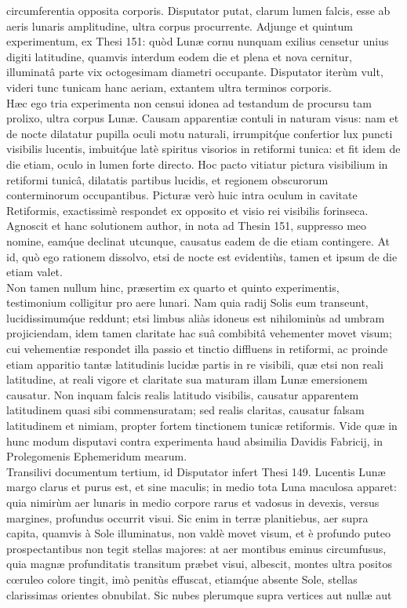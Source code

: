 \documentclass[a4paper, 11pt, oneside, polutonikogreek, german]{article}
\begin{document}
circumferentia opposita corporis. Disputator putat, clarum lumen falcis, esse ab aeris lunaris amplitudine, ultra corpus procurrente. Adjunge et quintum experimentum, ex Thesi 151: quòd Lunæ cornu nunquam exilius censetur unius digiti latitudine, quamvis interdum eodem die et plena et nova cernitur, illuminatâ parte vix octogesimam diametri occupante. Disputator iterùm vult, videri tunc tunicam hanc aeriam, extantem ultra terminos corporis.\\\hspace*{5mm}Hæc ego tria experimenta non censui idonea ad testandum de procursu tam prolixo, ultra corpus Lunæ. Causam apparentiæ contuli in naturam visus: nam et de nocte dilatatur pupilla oculi motu naturali, irrumpit\'que confertior lux puncti visibilis lucentis, imbuit\'que latè spiritus visorios in retiformi tunica: et fit idem de die etiam, oculo in lumen forte directo. Hoc pacto vitiatur pictura visibilium in retiformi tunicâ, dilatatis partibus lucidis, et regionem obscurorum conterminorum occupantibus. Picturæ verò huic intra oculum in cavitate Retiformis, exactissimè respondet ex opposito et visio rei visibilis forinseca.\\\hspace*{5mm}Agnoscit et hanc solutionem author, in nota ad Thesin 151, suppresso meo nomine, eam\'que declinat utcunque, causatus eadem de die etiam contingere. At id, quò ego rationem dissolvo, etsi de nocte est evidentiùs, tamen et ipsum de die etiam valet.\\\hspace*{5mm}Non tamen nullum hinc, præsertim ex quarto et quinto experimentis, testimonium colligitur pro aere lunari. Nam quia radij Solis eum transeunt, lucidissimum\'que reddunt; etsi limbus aliàs idoneus est nihilominùs ad umbram projiciendam, idem tamen claritate hac suâ combibitâ vehementer movet visum; cui vehementiæ respondet illa passio et tinctio diffluens in retiformi, ac proinde etiam apparitio tantæ latitudinis lucidæ partis in re visibili, quæ etsi non reali latitudine, at reali vigore et claritate sua maturam illam Lunæ emersionem causatur. Non inquam falcis realis latitudo visibilis, causatur apparentem latitudinem quasi sibi commensuratam; sed realis claritas, causatur falsam latitudinem et nimiam, propter fortem tinctionem tunicæ retiformis. Vide quæ in hunc modum disputavi contra experimenta haud absimilia Davidis Fabricij, in Prolegomenis Ephemeridum mearum.\\\hspace*{5mm}Transilivi documentum tertium, id Disputator infert Thesi 149. Lucentis Lunæ margo clarus et purus est, et sine maculis; in medio tota Luna maculosa apparet: quia nimirùm aer lunaris in medio corpore rarus et vadosus in devexis, versus margines, profundus occurrit visui. Sic enim in terræ planitiebus, aer supra capita, quamvis à Sole illuminatus, non valdè movet visum, et è profundo puteo prospectantibus non tegit stellas majores: at aer montibus eminus circumfusus, quia magnæ profunditatis transitum præbet visui, albescit, montes ultra positos cœruleo colore tingit, imò penitùs effuscat, etiam\'que absente Sole, stellas clarissimas orientes obnubilat. Sic nubes plerumque supra vertices aut nullæ aut 
\end{document}
